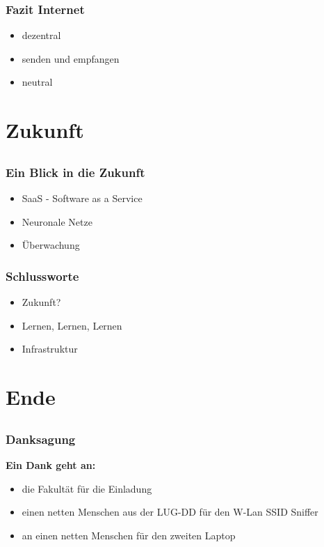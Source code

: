 \documentclass[12pt, table]{beamer}
\begin{document}
\begin{frame}
	\frametitle{Fazit Internet}
	\begin{itemize}
		\item<1-> dezentral
		\item<2-> senden und empfangen
		\item<3-> neutral
	\end{itemize}
\end{frame}

\section{Zukunft}
  \subsection{}
  
\begin{frame}
	\frametitle{Ein Blick in die Zukunft}
	\begin{itemize}
		\item<1-> SaaS - Software as a Service
		\item<2-> Neuronale Netze
		\item<3-> Überwachung
	\end{itemize}
\end{frame}
  
\begin{frame}
	\frametitle{Schlussworte}
	\begin{itemize}
		\item<1-> Zukunft?
		\item<2-> Lernen, Lernen, Lernen
		\item<3-> Infrastruktur
	\end{itemize}
\end{frame}

\section{Ende}
	\subsection{}

\begin{frame}
	\frametitle{Danksagung}
	\begin{center}
		\textbf{Ein Dank geht an:}
		\begin{itemize}
			\item<1-> die Fakultät für die Einladung
			\item<2-> einen netten Menschen aus der LUG-DD für den W-Lan SSID Sniffer
			\item<3-> an einen netten Menschen für den zweiten Laptop
		\end{itemize}
	\end{center}
\end{frame}
  
\end{document}
